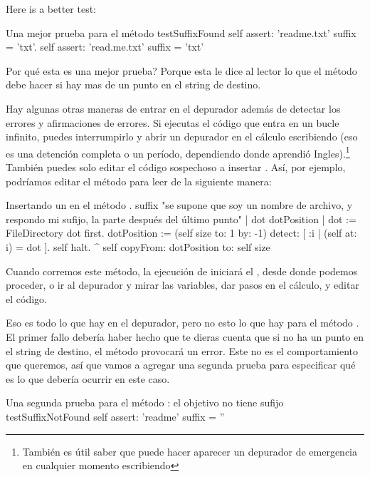 \documentclass[spanish,a4paper,10pt,twoside]{book}
\begin{document}
Here is a better test:

\begin{method}[testSuffix2]{Una mejor prueba para el m\'etodo }
testSuffixFound
	self assert: 'readme.txt' suffix = 'txt'.
	self assert: 'read.me.txt' suffix = 'txt'
\end{method}
\noindent
Por qu\'e esta es una mejor prueba?  Porque esta le dice al lector lo que el m\'etodo debe hacer si hay mas de un punto en el string de destino.

Hay algunas otras maneras de entrar en el depurador adem\'as de detectar los errores y afirmaciones de errores.
Si ejecutas el c\'odigo que entra en un bucle infinito, puedes interrumpirlo y
abrir un depurador en el c\'alculo escribiendo  (eso es una detenci\'on completa o un per\'iodo, dependiendo donde aprendi\'o Ingles).\footnote{Tambi\'en es \'util saber que puede hacer aparecer un depurador de emergencia en cualquier momento escribiendo } Tambi\'en puedes solo editar el c\'odigo sospechoso a insertar .
As\'i, por ejemplo, podr\'iamos editar el m\'etodo  para leer de la siguiente manera:

\needspace{11ex}
\begin{method}[suffix]{Insertando un  en el m\'etodo .}
suffix
	"se supone que soy un nombre de archivo, y respondo mi sufijo, la parte despu\'es del \'ultimo punto"
	| dot dotPosition |
	dot := FileDirectory dot first.
	dotPosition := (self size to: 1 by: -1) detect: [ :i | (self at: i) = dot ].
	self halt.
	^ self copyFrom: dotPosition to: self size
\end{method}

Cuando corremos este m\'etodo, la ejecuci\'on de  iniciar\'a el , desde donde podemos proceder, o ir al depurador y mirar las variables, dar pasos en el c\'alculo, y editar el c\'odigo.

Eso es todo lo que hay en el depurador, pero no esto lo que hay para el m\'etodo .
El primer fallo deber\'ia haber hecho que te dieras cuenta que si no ha un punto en el string de destino, el m\'etodo  provocar\'a un error.
Este no es el comportamiento que queremos, as\'i que vamos a agregar una segunda prueba para especificar qu\'e es lo que deber\'ia ocurrir en este caso.

\begin{method}[testNoSuffix]{Una segunda prueba para el m\'etodo : el objetivo no tiene sufijo}
testSuffixNotFound
	self assert: 'readme' suffix = ''
\end{method}
\end{document}
